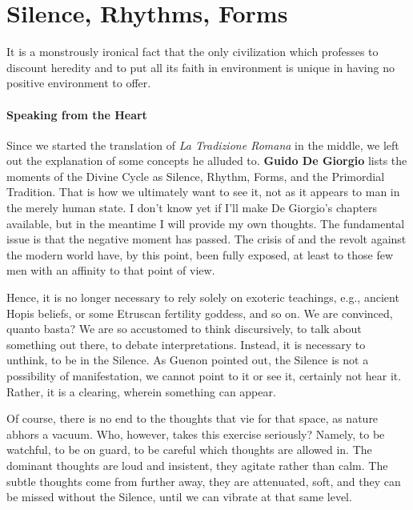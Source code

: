 \section{Silence, Rhythms, Forms}

\begin{quotex}
It is a monstrously ironical fact that the only civilization which professes to discount heredity and to put all its faith in environment is unique in having no positive environment to offer. 

\end{quotex}
\paragraph{Speaking from the Heart}
Since we started the translation of \textit{La Tra\-di\-zio\-ne Ro\-ma\-na} in the middle, we left out the explanation of some concepts he alluded to. \textbf{Guido De Giorgio} lists the moments of the Divine Cycle as Silence, Rhythm, Forms, and the Primordial Tradition. That is how we ultimately want to see it, not as it appears to man in the merely human state. I don't know yet if I'll make De Giorgio's chapters available, but in the meantime I will provide my own thoughts. The fundamental issue is that the negative moment has passed. The crisis of and the revolt against the modern world have, by this point, been fully exposed, at least to those few men with an affinity to that point of view.

Hence, it is no longer necessary to rely solely on exoteric teachings, e.g., ancient Hopis beliefs, or some Etruscan fertility goddess, and so on. We are convinced, quanto basta? We are so accustomed to think discursively, to talk about something out there, to debate interpretations. Instead, it is necessary to unthink, to be in the Silence. As Guenon pointed out, the Silence is not a possibility of manifestation, we cannot point to it or see it, certainly not hear it. Rather, it is a clearing, wherein something can appear.

Of course, there is no end to the thoughts that vie for that space, as nature abhors a vacuum. Who, however, takes this exercise seriously? Namely, to be watchful, to be on guard, to be careful which thoughts are allowed in. The dominant thoughts are loud and insistent, they agitate rather than calm. The subtle thoughts come from further away, they are attenuated, soft, and they can be missed without the Silence, until we can vibrate at that same level.

